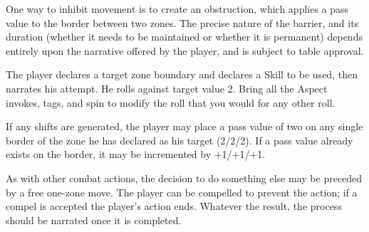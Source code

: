 One way to inhibit movement is to create an obstruction, which applies a pass value to the border between two zones. The precise nature of the barrier, and its duration (whether it needs to be maintained or whether it is permanent) depends entirely upon the narrative offered by the player, and is subject to table approval.

The player declares a target zone boundary and declares a Skill to be used, then narrates his attempt. He rolls \dplusskill{} against target value 2. Bring all the Aspect invokes, tags, and spin to modify the roll that you would for any other roll.

If any shifts are generated, the player may place a pass value of two on any single border of the zone he has declared as his target (2/2/2). If a pass value already exists on the border, it may be incremented by +1/+1/+1.

As with other combat actions, the decision to do something else may be preceded by a free one-zone move. The player can be compelled to prevent the action; if a compel is accepted the player's action ends. Whatever the result, the process should be narrated once it is completed.
